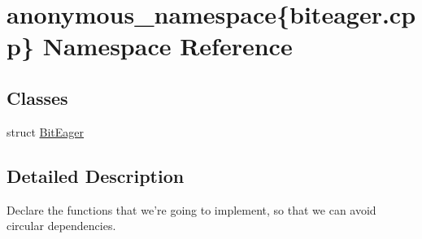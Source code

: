 \hypertarget{namespaceanonymous__namespace_02biteager_8cpp_03}{\section{anonymous\-\_\-namespace\{biteager.\-cpp\} Namespace Reference}
\label{namespaceanonymous__namespace_02biteager_8cpp_03}
}
\subsection*{Classes}
\begin{DoxyCompactItemize}
\item 
struct \hyperlink{structanonymous__namespace_02biteager_8cpp_03_1_1BitEager}{Bit\-Eager}
\end{DoxyCompactItemize}


\subsection{Detailed Description}
Declare the functions that we're going to implement, so that we can avoid circular dependencies. 